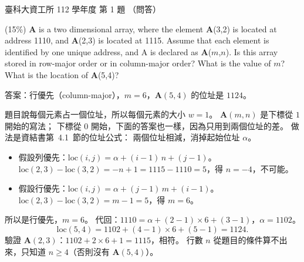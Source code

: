 \begin{pastexam}[label={px:ntust-112-ice-01}]{臺科大資工所 112 學年度 第 1 題}
（問答）

(15\%) \textbf{A} is a two dimensional array, where the element \textbf{A}(3,2) is located at
address 1110, and \textbf{A}(2,3) is located at 1115. Assume that each element is identified by one
unique address, and A is declared as \textbf{A}($m$,$n$). Is this array stored in row-major order or
in column-major order? What is the value of $m$? What is the location of \textbf{A}(5,4)?
\end{pastexam}

\begin{pastsoln}
答案：行優先（column-major），$m = 6$，$\mathbf{A}(5,4)$ 的位址是 $1124$。

題目說每個元素占一個位址，所以每個元素的大小 $w = 1$。 $\mathbf{A}(m, n)$ 是下標從 $1$ 開始的寫法；
下標從 $0$ 開始，下面的答案也一樣，因為只用到兩個位址的差。 做法是資結書第~4.1~節的位址公式：
兩個位址相減，消掉起始位址 $\alpha$。

\begin{itemize}
\item 假設列優先：$\mathrm{loc}(i, j) = \alpha + (i - 1)\,n + (j - 1)$。
$\mathrm{loc}(2,3) - \mathrm{loc}(3,2) = -n + 1 = 1115 - 1110 = 5$，得 $n = -4$，不可能。
\item 假設行優先：$\mathrm{loc}(i, j) = \alpha + (j - 1)\,m + (i - 1)$。
$\mathrm{loc}(2,3) - \mathrm{loc}(3,2) = m - 1 = 5$，得 $m = 6$。
\end{itemize}
所以是行優先，$m = 6$。 代回：$1110 = \alpha + (2 - 1) \times 6 + (3 - 1)$，$\alpha = 1102$。
\[
\mathrm{loc}(5,4) = 1102 + (4 - 1) \times 6 + (5 - 1) = 1124 .
\]
驗證 $\mathbf{A}(2,3)$：$1102 + 2 \times 6 + 1 = 1115$，相符。 行數 $n$ 從題目的條件算不出來，只知道
$n \ge 4$（否則沒有 $\mathbf{A}(5,4)$）。
\end{pastsoln}
